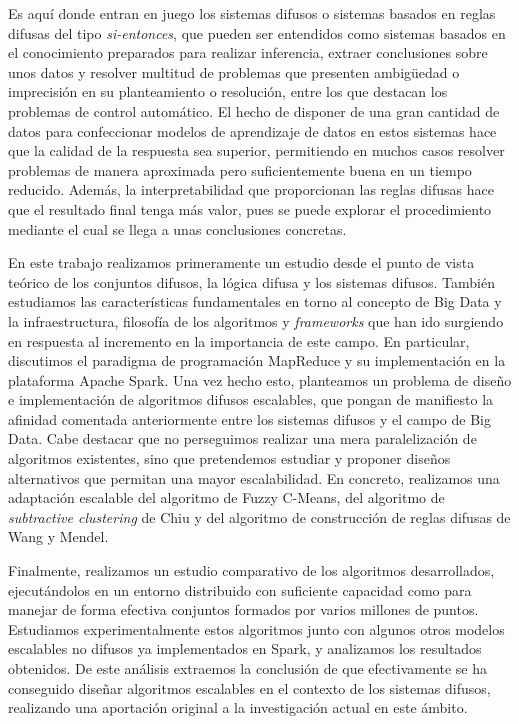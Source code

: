Es aquí donde entran en juego los sistemas difusos o sistemas basados en reglas difusas del tipo \textit{si-entonces}, que pueden ser entendidos como sistemas basados en el conocimiento preparados para realizar inferencia, extraer conclusiones sobre unos datos y resolver multitud de problemas que presenten ambigüedad o imprecisión en su planteamiento o resolución, entre los que destacan los problemas de control automático. El hecho de disponer de una gran cantidad de datos para confeccionar modelos de aprendizaje de datos en estos sistemas hace que la calidad de la respuesta sea superior, permitiendo en muchos casos resolver problemas de manera aproximada pero suficientemente buena en un tiempo reducido. Además, la interpretabilidad que proporcionan las reglas difusas hace que el resultado final tenga más valor, pues se puede explorar el procedimiento mediante el cual se llega a unas conclusiones concretas.

En este trabajo realizamos primeramente un estudio desde el punto de vista teórico de los conjuntos difusos, la lógica difusa y los sistemas difusos. También estudiamos las características fundamentales en torno al concepto de Big Data y la infraestructura, filosofía de los algoritmos y \textit{frameworks} que han ido surgiendo en respuesta al incremento en la importancia de este campo. En particular, discutimos el paradigma de programación MapReduce y su implementación en la plataforma Apache Spark. Una vez hecho esto, planteamos un problema de diseño e implementación de algoritmos difusos escalables, que pongan de manifiesto la afinidad comentada anteriormente entre los sistemas difusos y el campo de Big Data. Cabe destacar que no perseguimos realizar una mera paralelización de algoritmos existentes, sino que pretendemos estudiar y proponer diseños alternativos que permitan una mayor escalabilidad. En concreto, realizamos una adaptación escalable del algoritmo de Fuzzy C-Means, del algoritmo de \textit{subtractive clustering} de Chiu y del algoritmo de construcción de reglas difusas de Wang y Mendel.

Finalmente, realizamos un estudio comparativo de los algoritmos desarrollados, ejecutándolos en un entorno distribuido con suficiente capacidad como para manejar de forma efectiva conjuntos formados por varios millones de puntos. Estudiamos experimentalmente estos algoritmos junto con algunos otros modelos escalables no difusos ya implementados en Spark, y analizamos los resultados obtenidos. De este análisis extraemos la conclusión de que efectivamente se ha conseguido diseñar algoritmos escalables en el contexto de los sistemas difusos, realizando una aportación original a la investigación actual en este ámbito.



